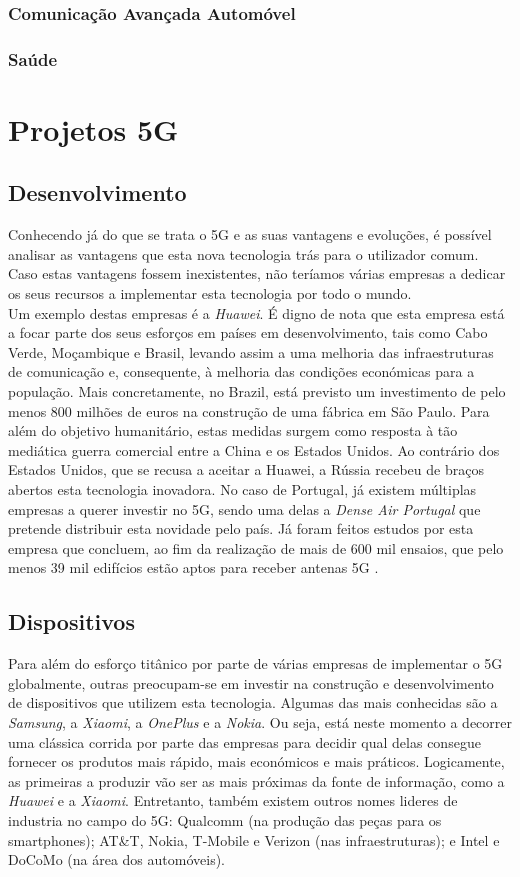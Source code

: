 \documentclass{llncs}
\begin{document}
\subsubsection{Comunicação Avançada Automóvel}
\subsubsection{Saúde}
\section{Projetos 5G}
\subsection{Desenvolvimento}
Conhecendo já do que se trata o 5G e as suas vantagens e evoluções,
é possível analisar as vantagens que esta nova tecnologia trás para
o utilizador comum.\\
Caso estas vantagens fossem inexistentes, não teríamos várias empresas
a dedicar os seus recursos a implementar esta tecnologia por todo o 
mundo.\\
Um exemplo destas empresas é a \textit{Huawei}.
É digno de nota que esta empresa está a focar parte dos seus esforços 
em países em desenvolvimento, tais como Cabo Verde, Moçambique e 
Brasil, levando assim a uma melhoria das infraestruturas de 
comunicação e, consequente, à melhoria das condições económicas para a
população. Mais concretamente, no Brazil, está previsto um
investimento de pelo menos 800 milhões de euros na construção de uma 
fábrica em São Paulo. Para além do objetivo humanitário, estas medidas
surgem como resposta à tão mediática guerra comercial entre a China e
os Estados Unidos.
Ao contrário dos Estados Unidos, que se recusa a aceitar a Huawei, a
Rússia recebeu de braços abertos esta tecnologia inovadora.
No caso de Portugal, já existem múltiplas empresas a querer investir
no 5G, sendo uma delas a \textit{Dense Air Portugal} que pretende
distribuir esta novidade pelo país.
Já foram feitos estudos por esta empresa que concluem, ao fim da
realização de mais de 600 mil ensaios, que pelo menos 39 mil edifícios
estão aptos para receber antenas 5G \cite{5GPortugal}.

\subsection{Dispositivos}
Para além do esforço titânico por parte de várias empresas de
implementar o 5G globalmente, outras preocupam-se em 
investir na construção e desenvolvimento de dispositivos que utilizem
esta tecnologia. Algumas das mais conhecidas são a \textit{Samsung}, a
\textit{Xiaomi}, a \textit{OnePlus} e a \textit{Nokia}.
Ou seja, está neste momento a decorrer uma clássica corrida por parte
das empresas para decidir qual delas consegue fornecer os produtos
mais rápido, mais económicos e mais práticos.
Logicamente, as primeiras a produzir vão ser as mais próximas da fonte
de informação, como a \textit{Huawei} e a \textit{Xiaomi}.
Entretanto, também existem outros nomes lideres de industria no campo 
do 5G: Qualcomm (na produção das peças para os smartphones);
AT\&T, Nokia, T-Mobile e Verizon (nas infraestruturas); e Intel e 
DoCoMo (na área dos automóveis). 
\end{document}
